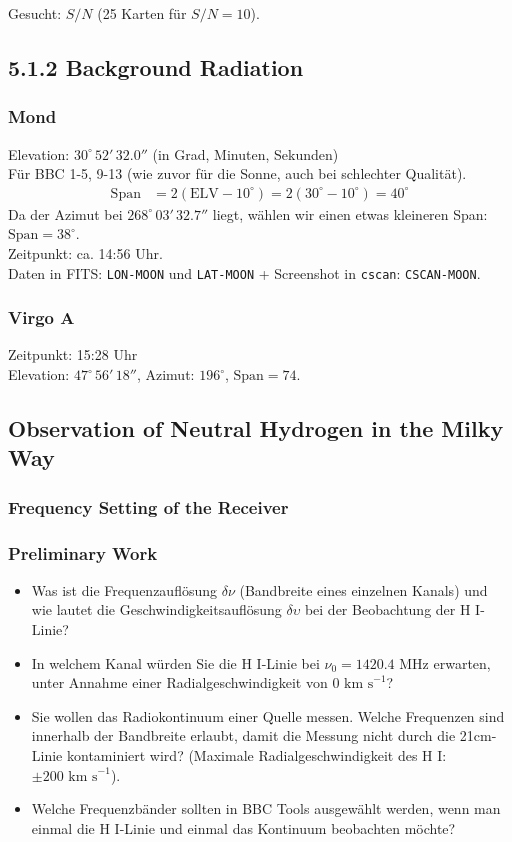 Gesucht: $S/N$ (25 Karten für $S/N = 10$).

\subsection*{5.1.2 Background Radiation}
\subsubsection*{Mond}
Elevation: $30^\circ \, 52' \, 32.0''$ (in Grad, Minuten, Sekunden) \\
Für BBC 1-5, 9-13 (wie zuvor für die Sonne, auch bei schlechter Qualität).
\begin{align}
\text{Span} &= 2(\text{ELV} - 10^\circ) = 2(30^\circ - 10^\circ) = 40^\circ
\end{align}
Da der Azimut bei $268^\circ \, 03' \, 32.7''$ liegt, wählen wir einen etwas kleineren Span: $\text{Span} = 38^\circ$. \\
Zeitpunkt: ca. 14:56 Uhr. \\
Daten in FITS: \texttt{LON-MOON} und \texttt{LAT-MOON} + Screenshot in \texttt{cscan}: \texttt{CSCAN-MOON}.

\subsubsection*{Virgo A}
Zeitpunkt: 15:28 Uhr \\
Elevation: $47^\circ \, 56' \, 18''$, Azimut: $196^\circ$, $\text{Span} = 74$.

\subsection*{Observation of Neutral Hydrogen in the Milky Way}
\subsubsection*{Frequency Setting of the Receiver}
\subsubsection*{Preliminary Work}
\begin{itemize}
    \item Was ist die Frequenzauflösung $\delta\nu$ (Bandbreite eines einzelnen Kanals) und wie lautet die Geschwindigkeitsauflösung $\delta\upsilon$ bei der Beobachtung der H I-Linie?
    \item In welchem Kanal würden Sie die H I-Linie bei $\nu_0 = 1420.4\text{ MHz}$ erwarten, unter Annahme einer Radialgeschwindigkeit von $0\text{ km s}^{-1}$?
    \item Sie wollen das Radiokontinuum einer Quelle messen. Welche Frequenzen sind innerhalb der Bandbreite erlaubt, damit die Messung nicht durch die 21cm-Linie kontaminiert wird? (Maximale Radialgeschwindigkeit des H I: $\pm 200\text{ km s}^{-1}$).
    \item Welche Frequenzbänder sollten in BBC Tools ausgewählt werden, wenn man einmal die H I-Linie und einmal das Kontinuum beobachten möchte?
\end{itemize}

